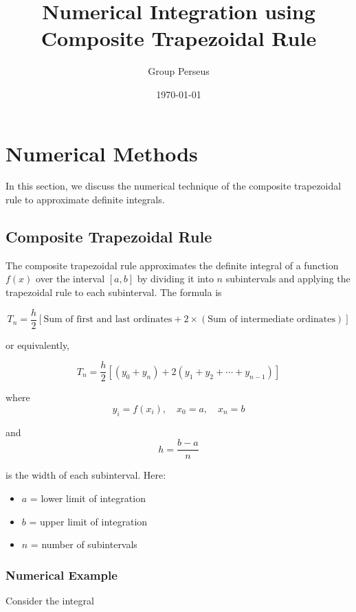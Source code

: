 \documentclass[12pt]{article}
\title{Numerical Integration using Composite Trapezoidal Rule}
\author{Group Perseus}
\date{\today}
\begin{document}
\maketitle


\section{Numerical Methods}

In this section, we discuss the numerical technique of the composite trapezoidal rule to approximate definite integrals.


\subsection{Composite Trapezoidal Rule}

The composite trapezoidal rule approximates the definite integral of a function
\(f(x)\) over the interval \([a,b]\) by dividing it into \(n\) subintervals
and applying the trapezoidal rule to each subinterval. The formula is

\[
T_n = \frac{h}{2}
\left[
\text{Sum of first and last ordinates}
+ 2 \times (\text{Sum of intermediate ordinates})
\right]
\]

or equivalently,

\[
T_n = \frac{h}{2}
\left[
(y_0 + y_n) + 2(y_1 + y_2 + \cdots + y_{n-1})
\right]
\]

where 
\[
y_i = f(x_i), \quad x_0 = a, \quad x_n = b
\]

and 
\[
h = \frac{b-a}{n}
\]

is the width of each subinterval. Here:
\begin{itemize}
    \item \(a\) = lower limit of integration
    \item \(b\) = upper limit of integration
    \item \(n\) = number of subintervals
\end{itemize}


\subsubsection*{Numerical Example}

Consider the integral
\end{document}
